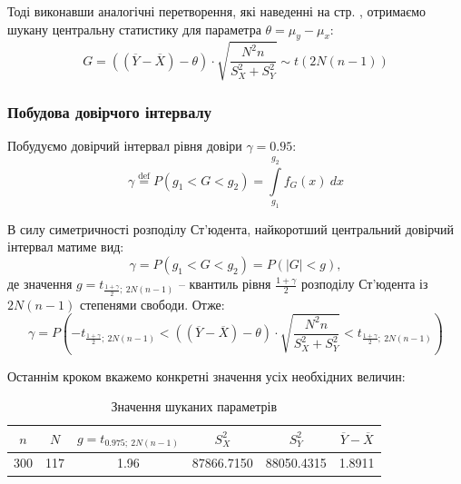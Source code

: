 Тоді виконавши аналогічні перетворення, які наведенні на стр. \pageref{seaching central statistic}, 
отримаємо шукану центральну статистику для параметра $\theta=\mu_y-\mu_x:$
\begin{equation*}
    G=\left((\overline{Y}-\overline{X})-\theta\right)\cdot 
    \sqrt{\frac{N^2n}{S_X^2+S_Y^2}}\sim t\left(2N(n-1)\right)
\end{equation*}

\subsubsection*{Побудова довірчого інтервалу}

Побудуємо довірчий інтервал рівня довіри $\gamma=0.95:$
\[ \gamma \overset{\mathrm{def}}{=} P(g_1<G<g_2)=\int\limits_{g_1}^{g_2}f_G(x)\ dx  \] 

В силу симетричності розподілу Ст'юдента, найкоротший центральний довірчий інтервал матиме вид:
\begin{equation*}
    \gamma = P(g_1<G<g_2)=P(|G|<g),
\end{equation*}
де значення $g=t_{\tfrac{1+\gamma}{2};\ 2N(n-1)}$ -- квантиль рівня $\frac{1+\gamma}{2}$ розподілу Ст'юдента із 
$2N(n-1)$ степенями свободи. Отже:
\begin{equation}
    \gamma = P\left(-t_{\tfrac{1+\gamma}{2};\ 2N(n-1)} < \left((\overline{Y}-\overline{X})-\theta\right)\cdot 
    \sqrt{\frac{N^2n}{S_X^2+S_Y^2}} < t_{\tfrac{1+\gamma}{2};\ 2N(n-1)}\right) \label{formula: ENG trusted interval}
\end{equation}

Останнім кроком вкажемо конкретні значення усіх необхідних величин:

\vspace{0.8cm}
\begin{table}[H]
    \begin{center}
        \begin{tabular}{||c|c|c|c|c|c||}
            \hline
            $n$ & $N$ & $g=t_{0.975;\ 2N(n-1)}$ & $S_X^2$ & $S_Y^2$ & $\overline{Y}-\overline{X}$ \\
            \hline \hline
            300 & 117 & 1.96 & 87866.7150 & 88050.4315 & 1.8911 \\
            \hline
        \end{tabular}
        \caption{Значення шуканих параметрів}
        \label{table: ENG interval}
    \end{center}
\end{table}

